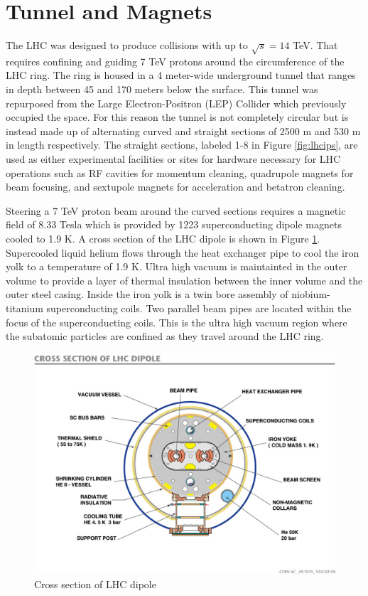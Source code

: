 \section{Tunnel and Magnets}
The LHC was designed to produce collisions with up to $\sqrt{s} = 14$ TeV.  That requires confining and guiding 7 TeV protons around the circumference of the LHC ring.  The ring is housed in a 4 meter-wide underground tunnel that ranges in depth between 45 and 170 meters below the surface.  This tunnel was repurposed from the Large Electron-Positron (LEP) Collider which previously occupied the space.  For this reason the tunnel is not completely circular but is instead made up of alternating curved and straight sections of 2500 m and 530 m in length respectively.  The straight sections, labeled 1-8 in Figure \ref{fig:lhcips}, are used as either experimental facilities or sites for hardware necessary for LHC operations such as RF cavities for momentum cleaning, quadrupole magnets for beam focusing, and sextupole magnets for acceleration and betatron cleaning. 

Steering a 7 TeV proton beam around the curved sections requires a magnetic field of 8.33 Tesla which is provided by 1223 superconducting dipole magnets cooled to 1.9 K.  A cross section of the LHC dipole is shown in Figure \ref{fig:lhcdipole}.  Supercooled liquid helium flows through the heat exchanger pipe to cool the iron yolk to a temperature of 1.9 K.  Ultra high vacuum is maintainted in the outer volume to provide a layer of thermal insulation between the inner volume and the outer steel casing.  Inside the iron yolk is a twin bore assembly of niobium-titanium superconducting coils.  Two parallel beam pipes are located within the focus of the superconducting coils.  This is the ultra high vacuum region where the subatomic particles are confined as they travel around the LHC ring.

\begin{figure}[h]
	\centering
	\includegraphics[width=0.7\linewidth]{Figures/LHCdipole}
	\caption{Cross section of LHC dipole \cite{dipole} }
	\label{fig:lhcdipole}
\end{figure}


